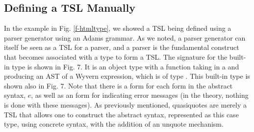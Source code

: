 %

\subsection{Defining a TSL Manually}

In the example in Fig. \ref{f-htmltype}, we showed a TSL being defined using a parser generator using an Adams grammar. As we noted, a parser generator can itself be seen as a TSL for a parser, and a parser is the fundamental construct that becomes associated with a type to form a TSL. The signature for the built-in type  is shown in Fig. 7. It is an object type with a  function taking in a  and producing an AST of a Wyvern expression, which is of type . This built-in type is shown also in Fig. 7. Note that there is a form for each form in the abstract syntax, $e$, as well as an  form for indicating error messages (in the theory, nothing is done with these messages). As previously mentioned, quasiquotes are merely a TSL that allows one to construct the abstract syntax, represented as this case type, using concrete syntax, with the addition of an unquote mechanism.


